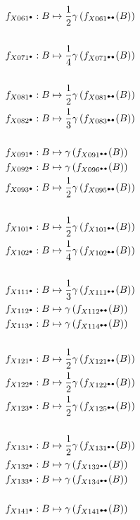 \documentclass{article}
\theoremstyle{plain}
\begin{document}
\begin{align*}
f_{X061^\bullet}: B&\mapsto
 \frac{1}{2}\gamma\left(f_{X061^\dumbbell}(B)\right)\\&\\
f_{X071^\bullet}: B&\mapsto
 \frac{1}{4}\gamma\left(f_{X071^\dumbbell}(B)\right)\\&\\
f_{X081^\bullet}: B&\mapsto
 \frac{1}{2}\gamma\left(f_{X081^\dumbbell}(B)\right)\\
f_{X082^\bullet}: B&\mapsto
 \frac{1}{3}\gamma\left(f_{X083^\dumbbell}(B)\right)\\&\\
f_{X091^\bullet}: B&\mapsto
 \gamma\left(f_{X091^\dumbbell}(B)\right)\\
f_{X092^\bullet}: B&\mapsto
 \gamma\left(f_{X096^\dumbbell}(B)\right)\\
f_{X093^\bullet}: B&\mapsto
 \frac{1}{2}\gamma\left(f_{X095^\dumbbell}(B)\right)\\&\\
f_{X101^\bullet}: B&\mapsto
 \frac{1}{2}\gamma\left(f_{X101^\dumbbell}(B)\right)\\
f_{X102^\bullet}: B&\mapsto
 \frac{1}{4}\gamma\left(f_{X102^\dumbbell}(B)\right)\\&\\
f_{X111^\bullet}: B&\mapsto
 \frac{1}{3}\gamma\left(f_{X111^\dumbbell}(B)\right)\\
f_{X112^\bullet}: B&\mapsto
 \gamma\left(f_{X112^\dumbbell}(B)\right)\\
f_{X113^\bullet}: B&\mapsto
 \gamma\left(f_{X114^\dumbbell}(B)\right)\\&\\
f_{X121^\bullet}: B&\mapsto
 \frac{1}{2}\gamma\left(f_{X121^\dumbbell}(B)\right)\\
f_{X122^\bullet}: B&\mapsto
 \frac{1}{2}\gamma\left(f_{X122^\dumbbell}(B)\right)\\
f_{X123^\bullet}: B&\mapsto
 \frac{1}{2}\gamma\left(f_{X125^\dumbbell}(B)\right)\\&\\
f_{X131^\bullet}: B&\mapsto
 \frac{1}{2}\gamma\left(f_{X131^\dumbbell}(B)\right)\\
f_{X132^\bullet}: B&\mapsto
 \gamma\left(f_{X132^\dumbbell}(B)\right)\\
f_{X133^\bullet}: B&\mapsto
 \gamma\left(f_{X134^\dumbbell}(B)\right)\\&\\
f_{X141^\bullet}: B&\mapsto
 \gamma\left(f_{X141^\dumbbell}(B)\right)\\

\end{align*}
\end{document}
